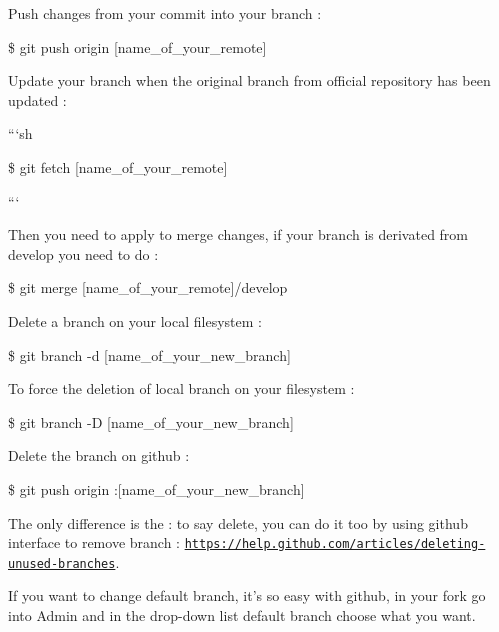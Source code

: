 Push changes from your commit into your branch \-:


\begin{DoxyPre}\$ git push origin [name\_of\_your\_remote]\end{DoxyPre}


Update your branch when the original branch from official repository has been updated \-:

```sh

\$ git fetch \mbox{[}name\-\_\-of\-\_\-your\-\_\-remote\mbox{]}

```

Then you need to apply to merge changes, if your branch is derivated from develop you need to do \-:


\begin{DoxyPre}\$ git merge [name\_of\_your\_remote]/develop\end{DoxyPre}


Delete a branch on your local filesystem \-:


\begin{DoxyPre}\$ git branch -d [name\_of\_your\_new\_branch]\end{DoxyPre}


To force the deletion of local branch on your filesystem \-:


\begin{DoxyPre}\$ git branch -D [name\_of\_your\_new\_branch]\end{DoxyPre}


Delete the branch on github \-:


\begin{DoxyPre}\$ git push origin :[name\_of\_your\_new\_branch]\end{DoxyPre}


The only difference is the \-: to say delete, you can do it too by using github interface to remove branch \-: \href{https://help.github.com/articles/deleting-unused-branches}{\tt https\-://help.\-github.\-com/articles/deleting-\/unused-\/branches}.

If you want to change default branch, it's so easy with github, in your fork go into Admin and in the drop-\/down list default branch choose what you want. 